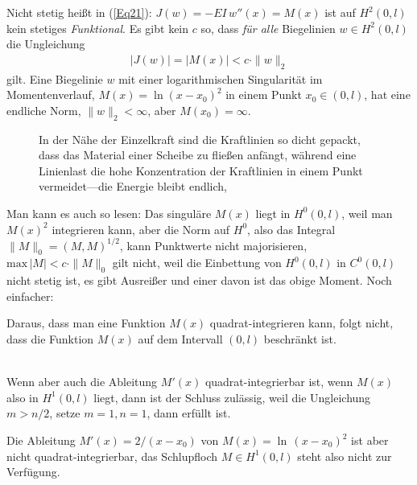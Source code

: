\begin{remark}
Nicht stetig hei{\ss}t in (\ref{Eq21}): $J(w) = - EI\,w''(x) = M(x)$ ist auf $H^2(0,l)$ kein stetiges {\em Funktional\/}. Es gibt kein $c$ so, dass {\em f\"{u}r alle\/} Biegelinien $w \in H^2(0,l)$ die Ungleichung
\begin{align}\label{Eq130}
|J(w)| = |M(x)| < c \cdot \|w\|_2
\end{align}
gilt. Eine Biegelinie $w$ mit einer logarithmischen Singularit\"{a}t im Momentenverlauf, $M(x) = \ln (x-x_0)^2$ in einem Punkt $x_0 \in (0,l)$, hat eine endliche Norm, $\|w\|_2 < \infty$, aber $M(x_0) = \infty$.

\begin{figure}[tbp]
\if {} \sidecaption \fi
{}
\caption{In der N\"{a}he der Einzelkraft sind die Kraftlinien so dicht gepackt, dass das Material einer Scheibe zu flie{\ss}en anf\"{a}ngt, w\"{a}hrend eine Linienlast die hohe Konzentration der Kraftlinien in einem Punkt vermeidet---die Energie bleibt endlich, \cite{Ha5}} \label{Feldlinien}
\end{figure}%

Man kann es auch so lesen: Das singul\"{a}re $M(x)$ liegt in $H^0(0,l)$, weil man $M(x)^2$ integrieren kann, aber die Norm auf $H^0$, also das Integral $\|M\|_0 = (M,M)^{1/2}$, kann  Punktwerte nicht majorisieren, $\text{max}\, |M| < c \cdot \|M\|_0$ gilt nicht, weil die Einbettung von $H^0(0,l)$ in $C^0(0,l)$ nicht stetig ist, es gibt Ausrei{\ss}er und einer davon ist das obige Moment. Noch einfacher: \\

\hspace*{-12pt}\colorbox{highlightBlue}{\parbox{0.98\textwidth} {Daraus, dass man eine Funktion $M(x)$ quadrat-integrieren kann, folgt nicht, dass die Funktion $M(x)$ auf dem Intervall $(0,l)$ beschr\"{a}nkt ist.}}\\

Wenn aber auch die Ableitung $M'(x)$ quadrat-integrierbar ist, wenn $M(x)$ also in $H^1(0,l)$ liegt, dann ist der Schluss zul\"{a}ssig, weil die Ungleichung $m > n/2$, setze $m = 1, n = 1$, dann erf\"{u}llt ist.

Die Ableitung $M'(x) = 2/(x-x_0)$ von $M(x) = \ln \,(x-x_0)^2$ ist aber nicht quadrat-integrierbar, das \glq Schlupfloch\grq{} $M \in H^1(0,l)$ steht also nicht zur Verf\"{u}gung.

\end{remark}


